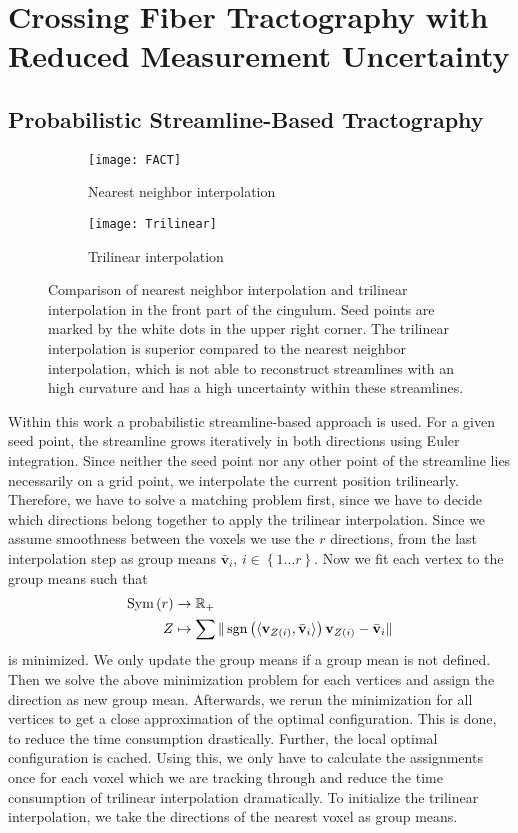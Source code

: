 \section{Crossing Fiber Tractography with Reduced Measurement Uncertainty}
\label{sec:tracking}
\subsection{Probabilistic Streamline-Based Tractography}
\begin{figure}[h]
	\centering
	\begin{subfigure}[b]{0.45\linewidth}
		\texttt{[image: FACT]}
		\caption{Nearest neighbor interpolation}
	\end{subfigure}
	\begin{subfigure}[b]{0.45\linewidth}
		\texttt{[image: Trilinear]}
		\caption{Trilinear interpolation}
	\end{subfigure}
	\caption{Comparison of nearest neighbor interpolation and trilinear
	interpolation in the front part of the cingulum. Seed points are marked
	by the white dots in the upper right corner. The trilinear interpolation
is superior compared to the nearest neighbor interpolation, which is not able to
reconstruct streamlines with an high curvature and has a high uncertainty within
these streamlines.}

	\label{fig:interpolation-comparison}
\end{figure}
Within this work a probabilistic streamline-based approach is used. For a given
seed point, the streamline grows iteratively in both directions using Euler
integration. Since neither the seed point nor any other point of the streamline
lies necessarily on a grid point, we interpolate the current position trilinearly. Therefore,
we have to solve a matching problem first, since we have to decide which
directions belong together to apply the trilinear interpolation. Since we assume
smoothness between the voxels we use the $r$ directions, from the last
interpolation step as group means $\bar{\mathbf{v}}_i$, $i \in \left\{ 1\dots r 
\right\}$. Now we fit each vertex to the group means such
that 
\begin{align}
	\text{Sym} \left( r  \right) & \rightarrow \mathbb{R}_+ \\ 
	Z & \mapsto \sum \| \operatorname*{sgn} \left( \langle \mathbf{v}_{Z \left( i \right)}
	, \bar{\mathbf{v}}_i \rangle  \right) \mathbf{v}_{Z \left( i \right)} -
\bar{\mathbf{v}}_i
	\|
\end{align}
is minimized. We only update the group means if a group mean is not defined.
Then we solve the above minimization problem for each vertices and assign the direction as new
group mean. Afterwards, we rerun the minimization for all vertices to get a
close approximation of the optimal configuration. This is done,
to reduce the time consumption drastically. Further, the local optimal
configuration is cached. Using this, we only have to calculate the assignments
once for each voxel which we are tracking through and reduce the time
consumption of trilinear interpolation dramatically. 
To initialize the trilinear interpolation, we take the directions of the nearest voxel as group means.

